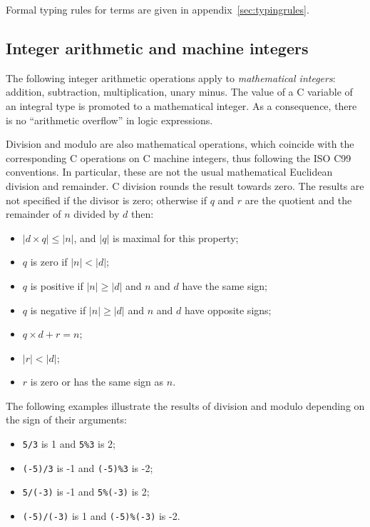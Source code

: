 Formal typing rules for terms are given in appendix~\ref{sec:typingrules}.
	
\subsection{Integer arithmetic and machine integers}

The following integer arithmetic operations apply to
\emph{mathematical integers}: addition, subtraction, multiplication,
unary minus. The value of a C variable of an integral type is promoted
to a mathematical integer. As a consequence, there is no
``arithmetic overflow'' in logic expressions.

Division and modulo are also mathematical operations, which coincide
with the corresponding C operations on C machine integers, thus
following the ISO C99 conventions. In particular, these are not the
usual mathematical Euclidean division and remainder.
C division
rounds the result towards zero. The results are not specified if the
divisor is zero; otherwise if $q$ and $r$ are the quotient and the
remainder of $n$ divided by $d$ then:
\begin{itemize}
\item $|d\times q| \leq |n|$, and $|q|$ is maximal for this property;
\item $q$ is zero if $|n|<|d|$;
\item $q$ is positive if $|n|\geq|d|$ and $n$ and $d$ have the same sign;
\item $q$ is negative if $|n|\geq|d|$ and $n$ and $d$ have opposite signs;
\item $q\times d+r = n$;
\item $|r|<|d|$;
\item $r$ is zero or has the same sign as $n$.
\end{itemize}

\begin{example}
  The following examples illustrate the results of division and modulo
  depending on the sign of their arguments:
  \begin{itemize}
  \item \lstinline|5/3| is 1 and \lstinline|5%3| is 2;
  \item \lstinline|(-5)/3| is -1 and \lstinline|(-5)%3| is -2;
  \item \lstinline|5/(-3)| is -1 and \lstinline|5%(-3)| is 2;
  \item \lstinline|(-5)/(-3)| is 1 and \lstinline|(-5)%(-3)| is -2.
  \end{itemize}
\end{example}


